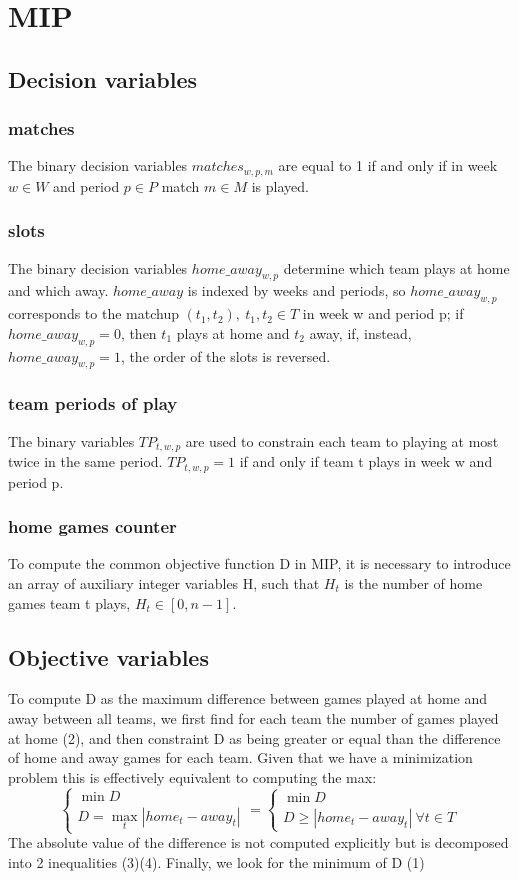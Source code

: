 \section{MIP}
\subsection{Decision variables}
\subsubsection{matches}
The binary decision variables $matches_{w,p,m}$ are equal to 1 if and only if in week $w \in W$ and period $p \in P$ match $m \in M$ is played.

\subsubsection{slots}
The binary decision variables $home\_away_{w,p}$ determine which team plays at home and which away. $home\_away$ is indexed by weeks and periods, so $home\_away_{w,p}$ corresponds to the matchup $(t_1, t_2), \ t_1, t_2 \in T$ in week w and period p; if $home\_away_{w,p} = 0$, then $t_1$ plays at home and $t_2$ away, if, instead, $home\_away_{w,p} = 1$, the order of the slots is reversed.

\subsubsection{team periods of play}
The binary variables $TP_{t,w,p}$ are used to constrain each team to playing at most twice in the same period. $TP_{t,w,p} = 1$ if and only if team t plays in week w and period p. 

\subsubsection{home games counter}
To compute the common objective function D in MIP, it is necessary to introduce an array of auxiliary integer variables H, such that $H_t$ is the number of home games team t plays, $H_t \in [0, n-1]$.

\subsection{Objective variables}
To compute D as the maximum difference between games played at home and away between all teams, we first find for each team the number of games played at home (2), and then constraint D as being greater or equal than the difference of home and away games for each team. Given that we have a minimization problem this is effectively equivalent to computing the max: $$\begin{cases}
    \min D \\
    D = \max_t |home_t - away_t|
\end{cases} = \begin{cases}
    \min D \\
    D \geq |home_t - away_t| \ \forall t \in T
\end{cases}$$The absolute value of the difference is not computed explicitly but is decomposed into 2 inequalities (3)(4). Finally, we look for the minimum of D (1)

